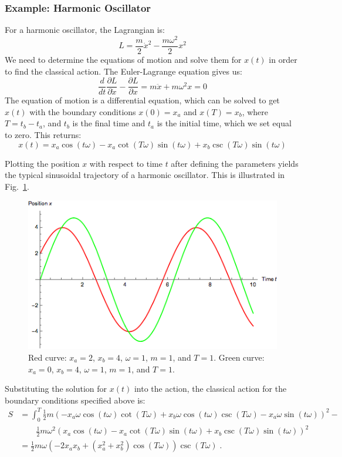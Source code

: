 \documentclass[12pt]{revtex4}
\begin{document}
\subsubsection{Example: Harmonic Oscillator}
For a harmonic oscillator, the Lagrangian is:
\[ L = \frac{m}{2}\dot{x}^2 - \frac{m \omega^2}{2}x^2 \]
We need to determine the equations of motion and solve them for $x(t)$ in order to find the classical action. The Euler-Lagrange equation gives us:
\begin{equation*}
\frac{d}{dt}\frac{\partial L}{\partial \dot{x}}-\frac{\partial L}{\partial x} = m\ddot{x}+m\omega^2x=0
\end{equation*}
The equation of motion is a differential equation, which can be solved to get $x(t)$ with the boundary conditions $x(0) = x_a$ and $x(T)=x_b$, where $T=t_b-t_a$, and $t_b$ is the final time and $t_a$ is the initial time, which we set equal to zero. This returns:
\[ x(t)= x_a \cos(t\omega) - x_a \cot(T \omega)\sin(t \omega)+x_b\csc(T \omega)\sin(t \omega) \]

Plotting the position $x$ with respect to time $t$ after defining the parameters yields the typical sinusoidal trajectory of a harmonic oscillator. This is illustrated in Fig.~\ref{fig:oscillator}.

\begin{figure}[h]
	\centering
	\includegraphics[width=0.7\linewidth]{"oscillator trajectory"}
	\caption{Red curve: $x_a=2$, $x_b=4$, $\omega=1$, $m=1$, and $T=1$. Green curve: $x_a=0$, $x_b=4$, $\omega=1$, $m=1$, and $T=1$.}
	\label{fig:oscillator}
\end{figure}

Substituting the solution for $x(t)$ into the action, the classical action for the boundary conditions specified above is: 
\begin{align*}
S &= \int_{0}^{T} \frac{1}{2} m (-x_a \omega \cos(t \omega) \cot(T \omega) + 
x_b \omega \cos(t \omega) \csc(T \omega) - 
x_a \omega \sin(t \omega))^2 - \\
&\qquad \frac{1}{2} m \omega^2 (x_a \cos(t \omega) - 
x_a \cot(T \omega) \sin(t \omega) + 
x_b \csc(T \omega) \sin(t \omega))^2 \\
&=\frac{1}{2} m \omega (-2 x_a x_b + (x_a^2 + x_b^2) \cos(T \omega)) \csc(T \omega) \; .
\end{align*} 
\end{document}
